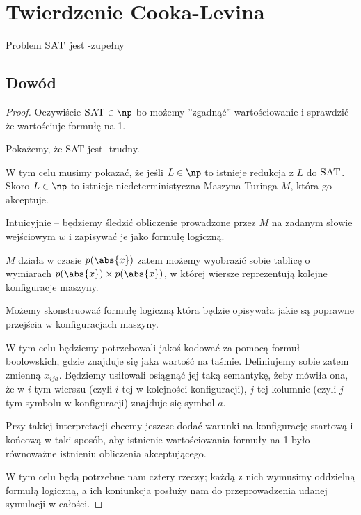 \section{Twierdzenie Cooka-Levina}

\begin{theorem}
    Problem \( \textsc{SAT} \) jest \np-zupełny
\end{theorem}

\subsection{Dowód}

\begin{proof}
    Oczywiście \( \textsc{SAT} \in \np \) bo możemy ''zgadnąć'' wartościowanie i sprawdzić że wartościuje formułę na 1.
    
    Pokażemy, że \textsc{SAT} jest \np-trudny.
    
    W tym celu musimy pokazać, że jeśli \( L \in \np \) to istnieje redukcja z \( L \) do \( \textsc{SAT} \).
    Skoro \( L \in \np \) to istnieje niedeterministyczna Maszyna Turinga \( M \), która go akceptuje. 
    
    Intuicyjnie -- będziemy śledzić obliczenie prowadzone przez \( M \) na zadanym słowie wejściowym \( w \) i zapisywać je jako formułę logiczną.
    
    \( M \) działa w czasie \( p(\abs{x}) \) zatem możemy wyobrazić sobie tablicę o wymiarach \( p(\abs{x}) \times p(\abs{x}) \), w której wiersze reprezentują kolejne konfiguracje maszyny.

    Możemy skonstruować formułę logiczną która będzie opisywała jakie są poprawne przejścia w konfiguracjach maszyny.
    
    W tym celu będziemy potrzebowali jakoś kodować za pomocą formuł boolowskich, gdzie znajduje się jaka wartość na taśmie. Definiujemy sobie zatem zmienną \( x_{ija} \). Będziemy usiłowali osiągnąć jej taką semantykę, żeby mówiła ona, że w \(i\)-tym wierszu (czyli \(i\)-tej w kolejności konfiguracji), \(j\)-tej kolumnie (czyli \(j\)-tym symbolu w konfiguracji) znajduje się symbol \(a\). 
    
    Przy takiej interpretacji chcemy jeszcze dodać warunki na konfigurację startową i końcową w taki sposób, aby istnienie wartościowania formuły na 1 było równoważne istnieniu obliczenia akceptującego.
    
    W tym celu będą potrzebne nam cztery rzeczy; każdą z nich wymusimy oddzielną formułą logiczną, a ich koniunkcja posłuży nam do przeprowadzenia udanej symulacji w całości.
    

\end{proof}
